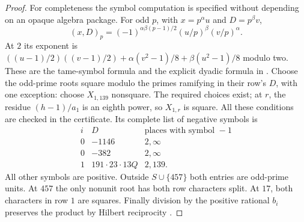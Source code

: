 \begin{proof}
For completeness the symbol computation is specified without
depending on an opaque algebra package.  For odd $p$, with
$x=p^\alpha u$ and $D=p^\beta v$,
\[
 (x,D)_p=(-1)^{\alpha\beta(p-1)/2}
          (u/p)^\beta(v/p)^\alpha.
\]
At $2$ its exponent is
$((u-1)/2)((v-1)/2)+\alpha(v^2-1)/8+\beta(u^2-1)/8$
modulo two.  These are the tame-symbol formula and the explicit
dyadic formula in \citet[VIII, \S5.8--5.10, pp.~246--247,
and p.~248]{RootMilneCFT}.  Choose the odd-prime roots square
modulo the primes ramifying in their row's $D$, with one
exception: choose $X_{1,139}$ nonsquare.  The required choices
exist; at $r$, the residue $(h-1)/a_1$ is an eighth power, so
$X_{1,r}$ is square.  All these conditions are checked in the
certificate.  Its complete list of negative symbols is
\[
\begin{array}{c|c|c}
 i&D&\text{places with symbol }-1\\ \hline
0&-1146&2,\infty\\
0&-382&2,\infty\\
1&191\cdot23\cdot13Q&2,139.
\end{array}
\tag{E.160.5}
\]
All other symbols are positive.  Outside $S\cup\{457\}$ both
entries are odd-prime units.  At $457$ the only nonunit root
has both row characters split.  At $17$, both characters in
row $1$ are squares.  Finally division by the positive rational
$b_i$ preserves the product by Hilbert reciprocity
\citep[VIII, (5.10), p.~247]{RootMilneCFT}.
\end{proof}

